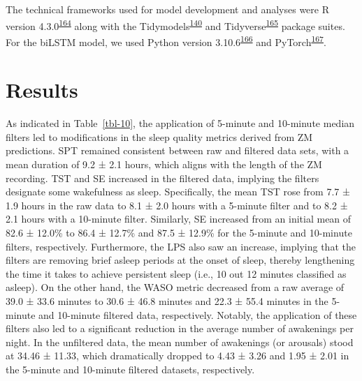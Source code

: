 \documentclass[
  10pt,
]{scrbook}
\begin{document}
The technical frameworks used for model development and analyses were R
version
4.3.0\textsuperscript{\protect\hyperlink{ref-rcoreteam_2023}{164}} along
with the
Tidymodels\textsuperscript{\protect\hyperlink{ref-kuhn_tidymodels_2020}{140}}
and
Tidyverse\textsuperscript{\protect\hyperlink{ref-wickham_tidyverse_2019}{165}}
package suites. For the biLSTM model, we used Python version
3.10.6\textsuperscript{\protect\hyperlink{ref-vanrossum_python_2009}{166}}
and
PyTorch\textsuperscript{\protect\hyperlink{ref-paszke_pytorch_2019}{167}}.

\hypertarget{results-2}{%
\section{Results}\label{results-2}}

As indicated in Table~\ref{tbl-10}, the application of 5-minute and
10-minute median filters led to modifications in the sleep quality
metrics derived from ZM predictions. SPT remained consistent between raw
and filtered data sets, with a mean duration of 9.2 ± 2.1 hours, which
aligns with the length of the ZM recording. TST and SE increased in the
filtered data, implying the filters designate some wakefulness as sleep.
Specifically, the mean TST rose from 7.7 ± 1.9 hours in the raw data to
8.1 ± 2.0 hours with a 5-minute filter and to 8.2 ± 2.1 hours with a
10-minute filter. Similarly, SE increased from an initial mean of 82.6 ±
12.0\% to 86.4 ± 12.7\% and 87.5 ± 12.9\% for the 5-minute and 10-minute
filters, respectively. Furthermore, the LPS also saw an increase,
implying that the filters are removing brief asleep periods at the onset
of sleep, thereby lengthening the time it takes to achieve persistent
sleep (i.e., 10 out 12 minutes classified as asleep). On the other hand,
the WASO metric decreased from a raw average of 39.0 ± 33.6 minutes to
30.6 ± 46.8 minutes and 22.3 ± 55.4 minutes in the 5-minute and
10-minute filtered data, respectively. Notably, the application of these
filters also led to a significant reduction in the average number of
awakenings per night. In the unfiltered data, the mean number of
awakenings (or arousals) stood at 34.46 ± 11.33, which dramatically
dropped to 4.43 ± 3.26 and 1.95 ± 2.01 in the 5-minute and 10-minute
filtered datasets, respectively.

\begingroup

\footnotesize
\end{document}
